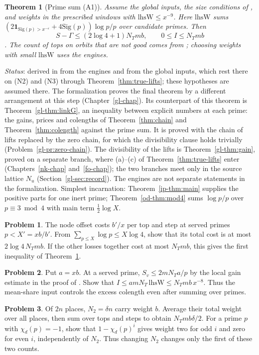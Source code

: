 \documentclass[reqno]{amsart}
\newcounter{chap}
\theoremstyle{definition}
\newtheorem{problem}{Problem}[section]
\theoremstyle{plain}
\newtheorem{theorem}{Theorem}[section]
\newcommand{\Sig}{\mathrm{Sig}}
\begin{document}
\begin{theorem}[Prime sum (A1)]\label{thm:K1}
Assume the global inputs, the size conditions of \cite[\S12.6]{Adr}, and weights in the prescribed windows with \(\mathrm{lhsW}\le x^{-9}\). Here \(\mathrm{lhsW}\) sums \( (2\mathbf1_{\Sig(p)>x^{-\varepsilon}}+4\Sig(p))\log p/p\) over candidate primes. Then
\[
 S-\Gamma\le(2\log4+1)N_Tmb,\qquad 0\le I\le N_Tmb
\]
\cite[Thm.~12.27]{Adr}. The count of tops on orbits that are not good comes from \cite[Prop.~5.20]{Adr}; choosing weights with small \(\mathrm{lhsW}\) uses the engines.
\end{theorem}
\noindent \emph{Status}: derived in \cite[Thm.~12.27]{Adr} from the engines \cite[Hyp.~12.12]{Adr} and from the global inputs, which rest there on (N2) and (N3) through Theorem~\ref{thm:true-lifts}; these hypotheses are assumed there.  The formalization proves the final theorem by a different arrangement at this step (Chapter~\ref{gl-chap}).  Its counterpart of this theorem is Theorem~\ref{gl-thm:linkG}, an inequality between explicit numbers at each prime: the gains, prices and colengths of Theorem~\ref{thm:chain} and Theorem~\ref{thm:colength} against the prime sum.  It is proved with the chain of lifts replaced by the zero chain, for which the divisibility clause holds trivially (Problem~\ref{gl-pr:zero-chain}).  The divisibility of the lifts is Theorem~\ref{gl-thm:gain}, proved on a separate branch, where (a)--(c) of Theorem~\ref{thm:true-lifts} enter (Chapters~\ref{nk-chap} and~\ref{fo-chap}); the two branches meet only in the source lattice \(N_u\) (Section~\ref{gl-sec:record}).  The engines are not separate statements in the formalization.  Simplest incarnation: Theorem~\ref{ip-thm:main} supplies the positive parts for one inert prime; Theorem~\ref{od-thm:mod4} sums \(\log p/p\) over \(p\equiv3\bmod4\) with main term \(\frac12\log X\).

\begin{problem}\label{pr:offset}
The node offset costs \(b'/x\) per top and step at served primes \(p<X'=xb/b'\). From \(\sum_{p\le X}\log p\le X\log4\), show that its total cost is at most \(2\log4\,N_Tmb\). If the other losses together cost at most \(N_Tmb\), this gives the first inequality of Theorem~\ref{thm:K1}.
\end{problem}
\begin{problem}\label{pr:mean}
Put \(a=xb\). At a served prime, \(S_v\le2mN_Ta/p\) by the local gain estimate in the proof of \cite[Thm.~12.27]{Adr}. Show that \(I\le amN_T\,\mathrm{lhsW}\le N_Tmb\,x^{-8}\). Thus the mean-share input controls the excess colength even after summing over primes.
\end{problem}
\begin{problem}\label{pr:place-count}
Of \(2n\) places, \(N_2=\delta n\) carry weight \(b\). Average their total weight over all places, then sum over tops and steps to obtain \(N_Tmb\delta/2\). For a prime \(p\) with \(\chi_d(p)=-1\), show that \(1-\chi_d(p)^i\) gives weight two for odd \(i\) and zero for even \(i\), independently of \(N_2\). Thus changing \(N_2\) changes only the first of these two counts.
\end{problem}
\end{document}

